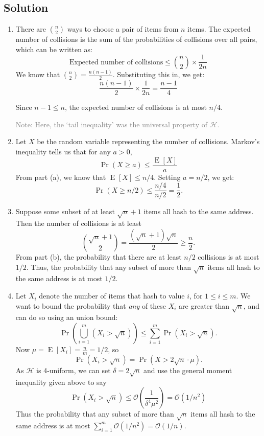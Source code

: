 \documentclass[14pt]{extreport}
\newcommand{\E}[2][]{\operatorname{E}_{#1}\left[#2\right]}
\renewcommand{\Pr}[2][]{\operatorname{Pr}_{#1}\left(#2\right)}
\begin{document}
\subsection*{Solution}
    \begin{enumerate}
        \item There are \(\binom{n}{2}\) ways to choose a pair of items from \(n\) items. The expected number of collisions is the sum of the probabilities of collisions over all pairs, which can be written as:
        \[\text{Expected number of collisions} \le \binom{n}{2} \times \frac{1}{2n}\]
        We know that \(\binom{n}{2} = \frac{n(n-1)}{2}\). Substituting this in, we get:
        \[
        \frac{n(n-1)}{2} \times \frac{1}{2n} = \frac{n-1}{4}
        \]
    
        Since \(n-1 \leq n\), the expected number of collisions is at most \(n/4\).

        \vspace{2mm}
        \textcolor{gray}{Note: Here, the `tail inequality' was the universal property of $\mathcal{H}$.}
        \item Let \(X\) be the random variable representing the number of collisions. Markov's inequality tells us that for any \(a > 0\),
        \[
        \Pr{X \geq a} \leq \frac{\E{X}}{a}
        \]
         From part (a), we know that \(\E{X} \leq n/4\). Setting \(a = n/2\), we get:
        \[
        \Pr{X \geq n/2} \leq \frac{n/4}{n/2} = \frac{1}{2}.
        \]
        \item Suppose some subset of at least $\sqrt{n} + 1$ items all hash to the same address. Then the number of collisions is at least $$\binom{\sqrt{n} + 1}{2} = \frac{(\sqrt{n} + 1)\sqrt{n}}{2} \ge \frac{n}{2}.$$ From part (b), the probability that there are at least $n/2$ collisions is at most $1/2$. Thus, the probability that any subset of more than \( \sqrt{n} \) items all hash to the same address is at most \( 1/2 \).
        \item Let $X_{i}$ denote the number of items that hash to value $i$, for $1 \le i \le m$. We want to bound the probability that \textit{any} of these $X_{i}$ are greater than $\sqrt{n}$, and can do so using an union bound: $$\Pr{\bigcup_{i = 1}^{m} \left(X_{i} > \sqrt{n}\right)} \le \sum_{i = 1}^{m} \Pr{X_{i} > \sqrt{n}}.$$ Now $\mu = \E{X_{i}} = \frac{n}{m}= 1/2$, so $$\Pr{X_{i} > \sqrt{n}} = \Pr{X > 2\sqrt{n} \cdot \mu}.$$ As $\mathcal{H}$ is 4-uniform, we can set $\delta = 2\sqrt{n}$ and use the general moment inequality given above to say $$\Pr{X_{i} > \sqrt{n}} \le \mathcal{O}\left(\frac{1}{\delta^{4}\mu^{2}}\right) = \mathcal{O}(1/n^{2})$$ Thus the probability that any subset of more than \( \sqrt{n} \) items all hash to the same address is at most \( \sum_{i = 1}^{m}\mathcal{O}(1/n^{2}) = \mathcal{O}(1/n) \).


\end{enumerate}
\end{document}
